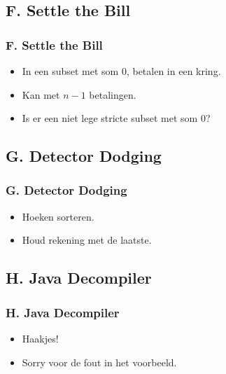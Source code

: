 \documentclass[14pt]{beamer}
\begin{document}
\subsection{F. Settle the Bill}
\begin{frame}
  \frametitle{F. Settle the Bill}
    \large
    \begin{itemize}
      \vspace*{-2mm}
      \item In een subset met som 0, betalen in een kring.
      \vspace*{5mm}
      \item<2-> Kan met $n-1$ betalingen.
      \vspace*{5mm}
      \item<2-> Is er een niet lege stricte subset met som 0?
    \end{itemize}
\end{frame}

\subsection{G. Detector Dodging}
\begin{frame}
  \frametitle{G. Detector Dodging}
    \large
    \begin{itemize}
      \vspace*{-2mm}
      \item Hoeken sorteren.
      \vspace*{5mm}
      \item Houd rekening met de laatste.
    \end{itemize}
\end{frame}

\subsection{H. Java Decompiler}
\begin{frame}
  \frametitle{H. Java Decompiler}
    \large
    \begin{itemize}
      \vspace*{-2mm}
      \item Haakjes!
      \vspace*{5mm}
      \item Sorry voor de fout in het voorbeeld.
    \end{itemize}
\end{frame}
\end{document}
